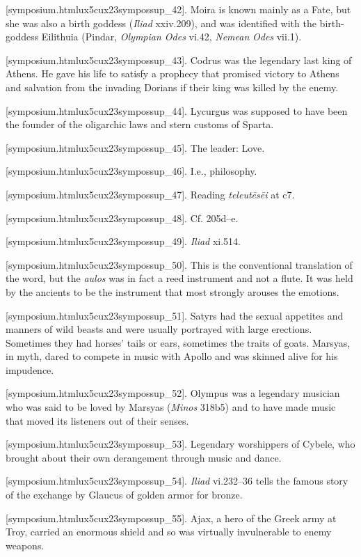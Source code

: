 [symposium.htmlux5cux23sympossup_42]. Moira is known mainly as
a Fate, but she was also a birth goddess ({\em Iliad} xxiv.209), and was
identified with the birth-goddess Eilithuia (Pindar, {\em Olympian Odes}
vi.42, {\em Nemean} {\em Odes} vii.1).

[symposium.htmlux5cux23sympossup_43]. Codrus was the legendary
last king of Athens. He gave his life to satisfy a prophecy that
promised victory to Athens and salvation from the invading Dorians if
their king was killed by the enemy.

[symposium.htmlux5cux23sympossup_44]. Lycurgus was supposed to
have been the founder of the oligarchic laws and stern customs of
Sparta.

[symposium.htmlux5cux23sympossup_45]. The leader: Love.

[symposium.htmlux5cux23sympossup_46]. I.e., philosophy.

[symposium.htmlux5cux23sympossup_47]. Reading {\em teleutēsēi}
at c7.

[symposium.htmlux5cux23sympossup_48]. Cf. 205d--e.

[symposium.htmlux5cux23sympossup_49]. {\em Iliad} xi.514.

[symposium.htmlux5cux23sympossup_50]. This is the conventional
translation of the word, but the {\em aulos} was in fact a reed
instrument and not a flute. It was held by the ancients to be the
instrument that most strongly arouses the emotions.

[symposium.htmlux5cux23sympossup_51]. Satyrs had the sexual
appetites and manners of wild beasts and were usually portrayed with
large erections. Sometimes they had horses' tails or ears, sometimes the
traits of goats. Marsyas, in myth, dared to compete in music with Apollo
and was skinned alive for his impudence.

[symposium.htmlux5cux23sympossup_52]. Olympus was a legendary
musician who was said to be loved by Marsyas ({\em Minos} 318b5) and to
have made music that moved its listeners out of their senses.

[symposium.htmlux5cux23sympossup_53]. Legendary worshippers of
Cybele, who brought about their own derangement through music and dance.

[symposium.htmlux5cux23sympossup_54]. {\em Iliad} vi.232--36
tells the famous story of the exchange by Glaucus of golden armor for
bronze.

[symposium.htmlux5cux23sympossup_55]. Ajax, a hero of the Greek
army at Troy, carried an enormous shield and so was virtually
invulnerable to enemy weapons.

